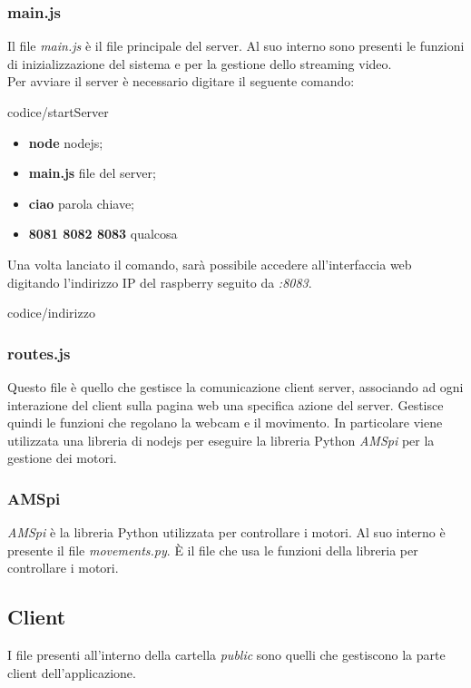 \documentclass[11pt]{article}
\begin{document}
\subsubsection{main.js}
Il file \textit{main.js} è il file principale del server. Al suo interno sono presenti le funzioni di inizializzazione del sistema e per la gestione dello streaming video.\\
Per avviare il server è necessario digitare il seguente comando:
\begin{lstinputlisting}[caption={Avvio server},basicstyle=\tiny]{codice/startServer}\end{lstinputlisting}
\begin{itemize}
	\item \textbf{node} nodejs;
	\item \textbf{main.js} file del server;
	\item \textbf{ciao} parola chiave; 
	\item \textbf{8081 8082 8083}  qualcosa 
\end{itemize}
Una volta lanciato il comando, sarà possibile accedere all'interfaccia web digitando l'indirizzo IP del raspberry seguito da \textit{:8083}.
\begin{lstinputlisting}[caption={Esempio indirizzo server},basicstyle=\tiny]{codice/indirizzo}\end{lstinputlisting}
\subsubsection{routes.js}
Questo file è quello che gestisce la comunicazione client server, associando ad ogni interazione del client sulla pagina web una specifica azione del server. Gestisce quindi le funzioni che regolano la webcam e il movimento. In particolare viene utilizzata una libreria di nodejs per eseguire la libreria Python \textit{AMSpi} per la gestione dei motori.
\subsubsection{AMSpi}
\textit{AMSpi} è la libreria Python utilizzata per controllare i motori. Al suo interno è presente il file \textit{movements.py}. È il file che usa le funzioni della libreria per controllare i motori.
\subsection{Client}
I file presenti all'interno della cartella \textit{public} sono quelli che gestiscono la parte client dell'applicazione.\\
\end{document}
